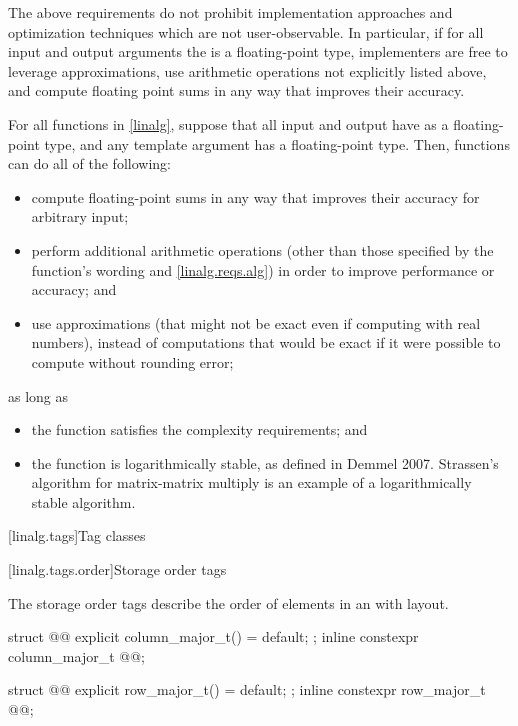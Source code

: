 \begin{note}
The above requirements do not prohibit
implementation approaches and optimization techniques
which are not user-observable.
In particular, if for all input and output arguments
the  is a floating-point type,
implementers are free to leverage approximations,
use arithmetic operations not explicitly listed above, and
compute floating point sums in any way that improves their accuracy.
\end{note}

\pnum
\begin{note}
For all functions in \ref{linalg},
suppose that all input and output  have as 
a floating-point type, and
any  template argument has a floating-point type.
Then, functions can do all of the following:
\begin{itemize}
\item
compute floating-point sums in any way
that improves their accuracy for arbitrary input;
\item
perform additional arithmetic operations
(other than those specified by the function's wording and \ref{linalg.reqs.alg})
in order to improve performance or accuracy; and
\item
use approximations
(that might not be exact even if computing with real numbers),
instead of computations that would be exact
if it were possible to compute without rounding error;
\end{itemize}
as long as
\begin{itemize}
\item
the function satisfies the complexity requirements; and
\item
the function is logarithmically stable,
as defined in Demmel 2007\supercite{linalg-stable}.
Strassen's algorithm for matrix-matrix multiply
is an example of a logarithmically stable algorithm.
\end{itemize}
\end{note}

[linalg.tags]{Tag classes}

[linalg.tags.order]{Storage order tags}

\pnum
The storage order tags describe
the order of elements in an  with
 layout.
\begin{itemdecl}
struct @@ {
  explicit column_major_t() = default;
};
inline constexpr column_major_t @@{};

struct @@ {
  explicit row_major_t() = default;
};
inline constexpr row_major_t @@{};
\end{itemdecl}

